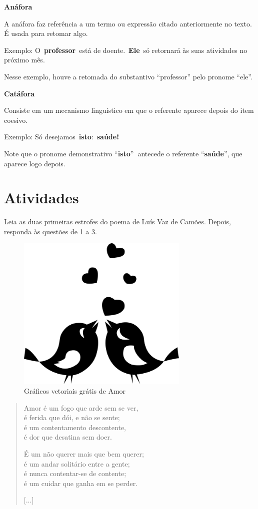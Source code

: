 {\textbf{Anáfora}

A anáfora faz referência a um termo ou expressão citado anteriormente no
texto. É usada para retomar algo.

Exemplo: O~\textbf{professor}~está de doente.~\textbf{Ele}~só retornará
às suas atividades no próximo mês.

Nesse exemplo, houve a retomada do substantivo ``professor'' pelo
pronome ``ele''.

\textbf{Catáfora}

Consiste em um mecanismo linguístico em que o referente aparece depois
do item coesivo.

Exemplo: Só desejamos~\textbf{isto}:~\textbf{saúde!}

Note que o pronome demonstrativo ``\textbf{isto}''\textbf{~}antecede o
referente ``\textbf{saúde}'', que aparece logo depois.
}

\section{Atividades}

Leia as duas primeiras estrofes do poema de Luís Vaz de Camões. Depois,
responda às questões de 1 a 3.


\begin{figure}
\centering
\includegraphics[width=3.22917in,height=2.92805in]{./_SAEB_9_POR/media/image24.png}
\caption{Gráficos vetoriais grátis de Amor}
\end{figure}


\begin{verse}
Amor é um fogo que arde sem se ver,\\
é ferida que dói, e não se sente;\\
é um contentamento descontente,\\
é dor que desatina sem doer.

É um não querer mais que bem querer;\\
é um andar solitário entre a gente;\\
é nunca contentar-se de contente;\\
é um cuidar que ganha em se perder.

{[}...{]}
\end{verse}

